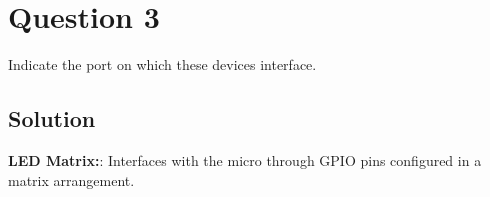 \section*{Question 3}

Indicate the port on which these devices interface.

\subsection*{Solution}

\textbf{LED Matrix:}: Interfaces with the micro through GPIO pins configured in a matrix arrangement.
